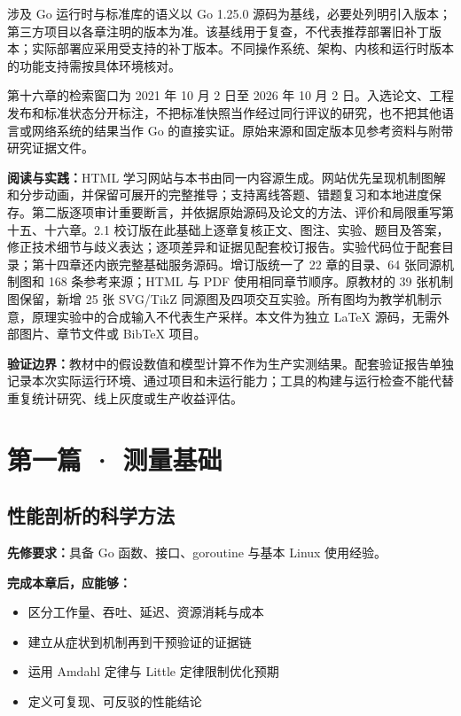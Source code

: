 \documentclass[UTF8,fontset=fandol,openany,11pt]{ctexbook}
\begin{document}
涉及 Go 运行时与标准库的语义以 Go 1.25.0 源码为基线，必要处列明引入版本；第三方项目以各章注明的版本为准。该基线用于复查，不代表推荐部署旧补丁版本；实际部署应采用受支持的补丁版本。不同操作系统、架构、内核和运行时版本的功能支持需按具体环境核对。

第十六章的检索窗口为 2021 年 10 月 2 日至 2026 年 10 月 2 日。入选论文、工程发布和标准状态分开标注，不把标准快照当作经过同行评议的研究，也不把其他语言或网络系统的结果当作 Go 的直接实证。原始来源和固定版本见参考资料与附带研究证据文件。

\textbf{阅读与实践：}HTML 学习网站与本书由同一内容源生成。网站优先呈现机制图解和分步动画，并保留可展开的完整推导；支持离线答题、错题复习和本地进度保存。第二版逐项审计重要断言，并依据原始源码及论文的方法、评价和局限重写第十五、十六章。2.1 校订版在此基础上逐章复核正文、图注、实验、题目及答案，修正技术细节与歧义表达；逐项差异和证据见配套校订报告。实验代码位于配套目录；第十四章还内嵌完整基础服务源码。增订版统一了 22 章的目录、64 张同源机制图和 168 条参考来源；HTML 与 PDF 使用相同章节顺序。原教材的 39 张机制图保留，新增 25 张 SVG/TikZ 同源图及四项交互实验。所有图均为教学机制示意，原理实验中的合成输入不代表生产采样。本文件为独立 LaTeX 源码，无需外部图片、章节文件或 BibTeX 项目。

\textbf{验证边界：}教材中的假设数值和模型计算不作为生产实测结果。配套验证报告单独记录本次实际运行环境、通过项目和未运行能力；工具的构建与运行检查不能代替重复统计研究、线上灰度或生产收益评估。
\tableofcontents
\listoffigures
\mainmatter
\part*{第一篇 · 测量基础}
\chapter{性能剖析的科学方法}
\label{ch:01}
\par\medskip
\noindent\textbf{先修要求：}具备 Go 函数、接口、goroutine 与基本 Linux 使用经验。

\noindent\textbf{完成本章后，应能够：}
\begin{itemize}
\item 区分工作量、吞吐、延迟、资源消耗与成本
\item 建立从症状到机制再到干预验证的证据链
\item 运用 Amdahl 定律与 Little 定律限制优化预期
\item 定义可复现、可反驳的性能结论
\end{itemize}
\end{document}
